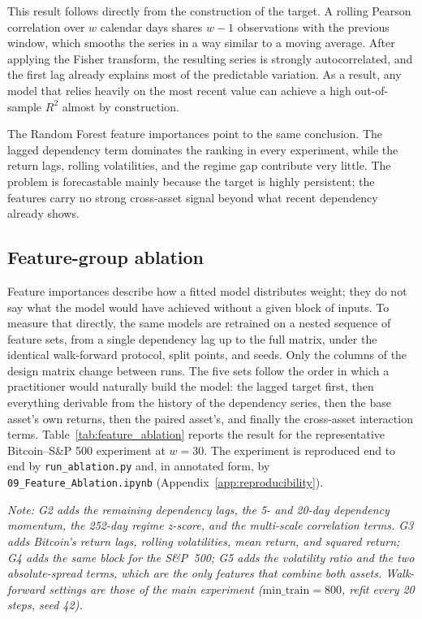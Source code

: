 This result follows directly from the construction of the target. A rolling Pearson correlation over $w$ calendar days shares $w-1$ observations with the previous window, which smooths the series in a way similar to a moving average. After applying the Fisher transform, the resulting series is strongly autocorrelated, and the first lag already explains most of the predictable variation. As a result, any model that relies heavily on the most recent value can achieve a high out-of-sample $R^2$ almost by construction.

The Random Forest feature importances point to the same conclusion. The lagged dependency term dominates the ranking in every experiment, while the return lags, rolling volatilities, and the regime gap contribute very little. The problem is forecastable mainly because the target is highly persistent; the features carry no strong cross-asset signal beyond what recent dependency already shows.

\subsection{Feature-group ablation}
\label{sec:ablation}

Feature importances describe how a fitted model distributes weight; they do not say what the model would have achieved without a given block of inputs. To measure that directly, the same models are retrained on a nested sequence of feature sets, from a single dependency lag up to the full matrix, under the identical walk-forward protocol, split points, and seeds. Only the columns of the design matrix change between runs. The five sets follow the order in which a practitioner would naturally build the model: the lagged target first, then everything derivable from the history of the dependency series, then the base asset's own returns, then the paired asset's, and finally the cross-asset interaction terms. Table~\ref{tab:feature_ablation} reports the result for the representative Bitcoin--S\&P 500 experiment at $w = 30$. The experiment is reproduced end to end by \texttt{run\_ablation.py} and, in annotated form, by \texttt{09\_Feature\_Ablation.ipynb} (Appendix~\ref{app:reproducibility}).

\begin{table}[H]
    \centering
    \caption{Feature-group ablation, Bitcoin--S\&P~500 at $w = 30$. Each row adds a block of features to the row above and keeps everything before it; \# is the resulting number of columns in the design matrix.}
    \label{tab:feature_ablation}
    
    \par\smallskip\noindent\footnotesize{\textit{Note: G2 adds the remaining dependency lags, the 5- and 20-day dependency momentum, the 252-day regime z-score, and the multi-scale correlation terms. G3 adds Bitcoin's return lags, rolling volatilities, mean return, and squared return; G4 adds the same block for the S\&P~500; G5 adds the volatility ratio and the two absolute-spread terms, which are the only features that combine both assets. Walk-forward settings are those of the main experiment ($\mathrm{min\_train} = 800$, refit every 20 steps, seed 42).}}
\end{table}

